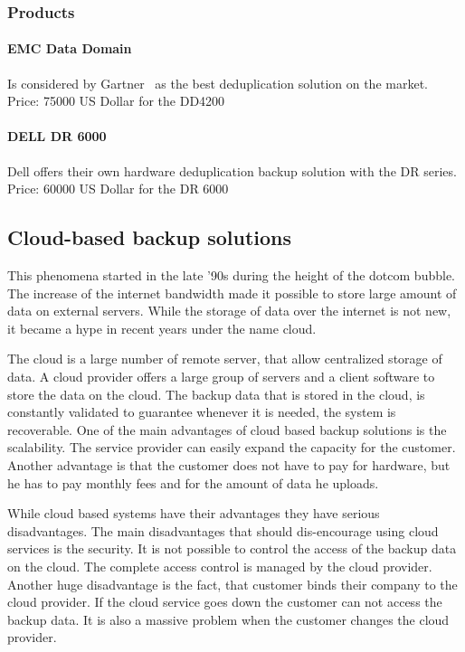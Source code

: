 \subsubsection{Products} 

\paragraph{EMC Data Domain} Is considered by Gartner~\cite{Gart} as the
best deduplication solution on the market. Price: 75000 US Dollar for
the DD4200

\paragraph{DELL DR 6000} Dell offers their own hardware deduplication
backup solution with the DR series. Price: 60000 US Dollar for the DR
6000 

\subsection{Cloud-based backup solutions}

This phenomena started in the late '90s during the height of the dotcom
bubble. The increase of the internet bandwidth made it possible to store
large amount of data on external servers. While the storage of data over
the internet is not new, it became a hype in recent years under the name
cloud.

The cloud is a large number of remote server, that allow centralized
storage of data.  A cloud provider offers a large group of servers and a
client software to store the data on the cloud.  The backup data that is
stored in the cloud, is constantly validated to guarantee whenever it is
needed, the system is recoverable.  One of the main advantages of cloud
based backup solutions is the scalability. The service provider can
easily expand the capacity for the customer. Another advantage is that
the customer does not have to pay for hardware, but he has to pay
monthly fees and for the amount of data he uploads.

While cloud based systems have their advantages they have serious
disadvantages. The main disadvantages that should dis-encourage using
cloud services is the security.  It is not possible to control the
access of the backup data on the cloud. The complete access control is
managed by the cloud provider. Another huge disadvantage is the fact,
that customer binds their company to the cloud provider. If the cloud
service goes down the customer can not access the backup data. It is
also a massive problem when the customer changes the cloud provider.

